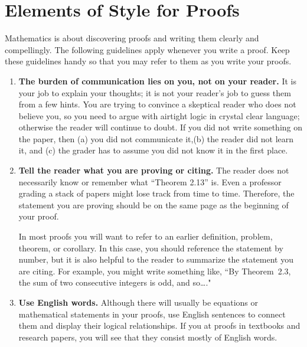 \appendix
\chapter{Elements of Style for Proofs}
\label{appendix:elements_of_style}

Mathematics is about discovering proofs and writing them clearly and compellingly. The following guidelines apply whenever you write a proof.  Keep these guidelines handy so that you may refer to them as you write your proofs.

\begin{enumerate}

\item \textbf{The burden of communication lies on you, not on your reader.}
It is your job to explain your thoughts; it is not your reader's job to guess them from a few hints. You are trying to convince a skeptical reader who does not believe you, so you need to argue with airtight logic in crystal clear language; otherwise the reader will continue to doubt. If you did not write something on the paper, then (a) you did not communicate it,(b) the reader did not learn it, and (c) the grader has to assume you did not know it in the first place.
          
\item \textbf{Tell the reader what you are proving or citing.}
The reader does not necessarily know or remember what ``Theorem 2.13'' is. Even a professor grading a stack of papers might lose track from time to time. Therefore, the statement you are proving should be on the same page as the beginning of your proof. 

In most proofs you will want to refer to an earlier definition, problem, theorem, or corollary.  In this case, you should reference the statement by number, but it is also helpful to the reader to summarize the statement you are citing.  For example, you might write something like, ``By Theorem~2.3, the sum of two consecutive integers is odd, and so\ldots."

\item \textbf{Use English words.}
Although there will usually be equations or mathematical statements in your proofs, use English sentences to connect them and display their logical relationships. If you at proofs in textbooks and research papers, you will see that they consist mostly of English words.


\end{enumerate}
